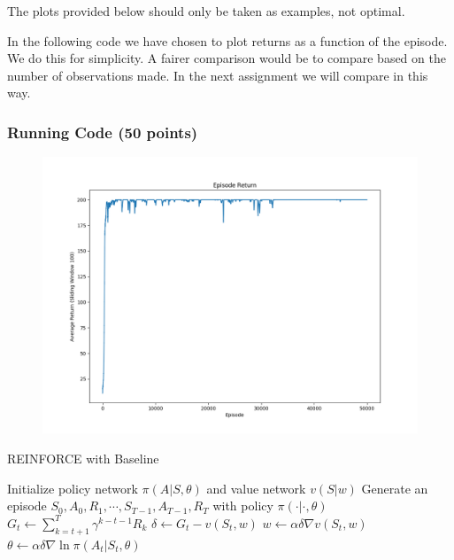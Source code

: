 \documentclass{article}
\begin{document}
The plots provided below should only be taken as examples, not optimal.

In the following code we have chosen to plot returns as a function of the episode. We do this for simplicity. A fairer comparison would be to compare based on the number of observations made. In the next assignment we will compare in this way.

\subsubsection{Running Code (50 points)}

\begin{figure}[H]
\begin{center}
\centerline{\includegraphics[scale=0.5]{img/my_return.png}}
\end{center}
\end{figure}


\begin{algorithm}[H]
	\caption{REINFORCE with Baseline}
	\begin{algorithmic}
		\Require Initialize policy network $ \pi(A|S, \theta) $ and value network $ v(S|w) $
			\State Generate an episode $ S_0, A_0, R_1, \cdots, S_{T-1}, A_{T-1}, R_T $ with policy $ \pi(\cdot|\cdot, \theta) $
			\State $G_t \leftarrow\sum^T_{k=t+1}\gamma^{k-t-1}R_k$
			\State $\delta \leftarrow G_t - v(S_t, w) $
			\State $ w \leftarrow \alpha \delta \nabla v(S_t, w) $
			\State $ \theta \leftarrow \alpha \delta \nabla \ln\pi(A_t|S_t,\theta) $
			\EndFor
		\EndFor
	\end{algorithmic}
\end{algorithm}
\end{document}
